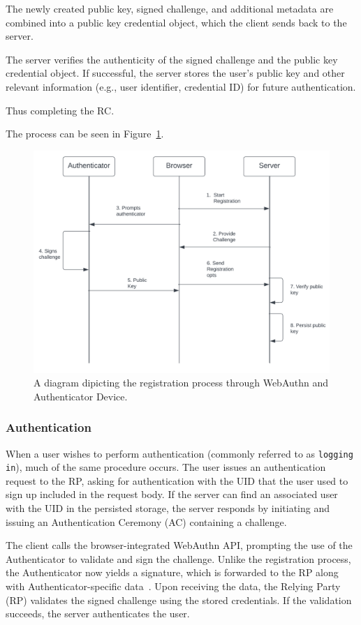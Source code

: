 The newly created public key, signed challenge, and additional metadata are
combined into a public key credential object, which the client sends back to
the server.

The server verifies the authenticity of the signed challenge and the public key credential object.
If successful, the server stores the user's public key and other relevant information (e.g., user identifier, credential ID)
for future authentication.

Thus completing the RC\@.

The process can be seen in Figure~\ref{fig:registration}.
\begin{figure}[htbp]
  \centering
  \includegraphics[width=0.75\linewidth]{images/Registration}
  \caption{\footnotesize A diagram dipicting the registration process through WebAuthn and Authenticator Device.}
  \label{fig:registration}
\end{figure}

\subsubsection{Authentication}\label{subsubsec:authentication}
When a user wishes to perform authentication (commonly referred to as \texttt{logging in}), much of the same procedure
occurs.
The user issues an authentication request to the RP, asking for authentication
with the UID that the user used to sign up included in the request body.
If the server can find an associated user with the UID in the persisted storage,
the server responds by initiating and issuing an Authentication Ceremony (AC)
containing a challenge.

The client calls the browser-integrated WebAuthn API, prompting the use of the
Authenticator to validate and sign the challenge.
Unlike the registration process, the Authenticator now yields a signature, which is forwarded to the RP along with
Authenticator-specific data~\cite{webauthn_authenticator_data}.
Upon receiving the data, the Relying Party (RP) validates the signed challenge using the stored credentials.
If the validation succeeds, the server authenticates the user.


